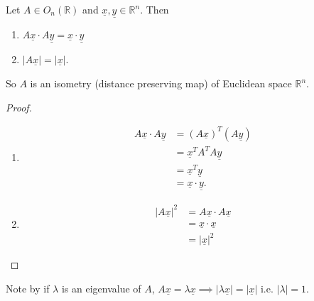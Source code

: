\begin{lemma}\label{lem:20}
    Let $A \in O_n(\mathbb{R})$ and $\underline{x}, \underline{y} \in \mathbb{R}^n$. Then
    \begin{enumerate}
        \item $A \underline{x} \cdot A \underline{y} = \underline{x} \cdot \underline{y}$
        \item $|A \underline{x}| = |\underline{x}|$. \label{07-itm-2}
    \end{enumerate} 
    So $A$ is an isometry (distance preserving map) of Euclidean space $\mathbb{R}^n$.
\end{lemma} 

\begin{proof} ~
    \begin{enumerate}
        \item \begin{align*}
            A \underline{x} \cdot A \underline{y} &= (A \underline{x})^T (A \underline{y}) \\
            &= \underline{x}^T A^T A \underline{y} \\
            &= \underline{x}^T \underline{y} \\
            &= \underline{x} \cdot \underline{y}.
        \end{align*} 
        \item \begin{align*}
            |A \underline{x}|^2 &= A \underline{x} \cdot A \underline{x} \\
            &= \underline{x} \cdot \underline{x} \\
            &= |\underline{x}|^2
        \end{align*} 
    \end{enumerate} 
\end{proof} 

Note by  if $\lambda$ is an eigenvalue of $A$, $A \underline{x} = \lambda \underline{x} \implies |\lambda \underline{x}| = |\underline{x}|$ i.e. $|\lambda| = 1$.

